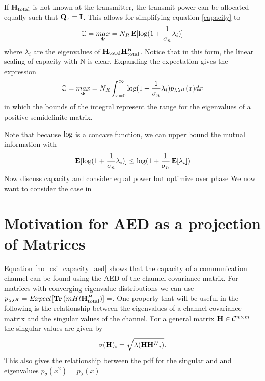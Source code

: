 \documentclass[12pt,a4paper]{report}
\begin{document}
If $\mathbf{H}_\text{total}$ is not known at the transmitter, the transmit power can be allocated
equally such that $\mathbf{Q}_x = \mathbf{I}$. This allows for simplifying equation \eqref{capacity} to 
\begin{equation}\label{no_csi_capacity}
\mathbb{C} = \underset{\boldsymbol{\Phi}}{\mathop{max}} = N_R \mathop{\bf E{}}[\text{log{}}(1 + \frac{1}{\sigma_n}\lambda_i)]
\end{equation}
where $\lambda_i$ are the eigenvalues of $\mathbf{H}_\text{total} \mathbf{H}_\text{total}^H$.
Notice that in this form, the linear scaling of capacity with N is clear.
Expanding the expectation gives the expression
\begin{equation}\label{no_csi_capacity_aed}
\mathbb{C} = \underset{\boldsymbol{\Phi}}{\mathop{max}} = N_R  \int_{x=0}^{\infty}\text{log{}}(1 + \frac{1}{\sigma_n}\lambda_i)p_{\lambda\lambda^H}(x) dx
\end{equation}
in which the bounds of the integral represent the range for the eigenvalues of a positive semidefinite matrix. 

Note that because $\text{log{}}$ is a concave function, we can upper bound the mutual information with
\begin{equation}\label{mut_inf}
\mathop{\bf E{}}[\text{log{}}(1 + \frac{1}{\sigma_n}\lambda_i)] \leq \text{log{}}(1 + \frac{1}{\sigma_n}\mathop{\bf E{}}[\lambda_i])
\end{equation}
Now discuss capacity and consider equal power but optimize over phase
We now want to consider the case in 

\section{Motivation for AED as a projection of Matrices}
Equation \ref{no_csi_capacity_aed} shows that the capacity of a communication channel can be found using the AED of the channel covariance matrix.
For matrices with converging eigenvalue distributions we can use $p_{\lambda\lambda^H} = Expect[\mathop{\bf Tr}{(mHt \mathbf{H}_\text{total}^H})] = $.
One property that will be useful in the following is the relationship between the eigenvalues of a channel covariance matrix and the singular values of
the channel.
For a general matrix $\mathbf{H} \in \mathcal{C}^{n \times m}$ the singular values are given by 
\begin{equation}\label{sigular_eigen}
\sigma(\mathbf{H})_i = \sqrt{\lambda({\mathbf{H}\mathbf{H}^H}_i)}.
\end{equation}
This also gives the relationship between the pdf for the singular and and eigenvalues $p_{\sigma}(x^2) = p_{\lambda}(x)$
\end{document}
